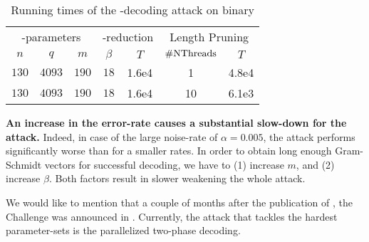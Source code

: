 \vspace{10pt}
\begin{table}[h]
	\centering
	\begin{tabular}{ccc|cc|cc}
		\toprule
		\multicolumn{3}{c|}{\LWE-parameters}  & \multicolumn{2}{c|}{\BKZ-reduction}  & \multicolumn{2}{c}{Length Pruning} \\
		$n$   & $q$                      & $m$   & $\beta$ & $T$         & $\mathrm{\#NThreads}$ &  $T$      \\\midrule     
		$130$ & $4093$     & $190$ & $18$     & 1.6e4     & 1 & 4.8e4  \\ 
		$130$ & $4093$     & $190$ & $18$     & 1.6e4     & 10 & 6.1e3  \\
		\bottomrule
	\end{tabular}
	\caption{Running times of the \BDD-decoding attack on binary \LWE}
	\label{table:RunTimesBinError}
\end{table}

\vspace{8pt} \hspace{5pt} \textbf{An increase in the error-rate causes a substantial slow-down for the attack.} Indeed, in case of the large noise-rate of $\alpha=0.005$, the attack performs significantly worse than for a smaller rates. In order to obtain long enough Gram-Schmidt vectors for successful decoding, we have to (1) increase $m$, and (2) increase $\beta$. Both factors result in slower \BKZ weakening the whole attack. 

\vspace{8pt}

We would like to mention that a couple of months after the publication of \cite{ACNS:KMW16}, the \LWE Challenge was announced in \cite{LWEChallenge}. Currently, the attack that tackles the hardest parameter-sets is the parallelized two-phase decoding.